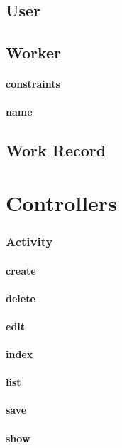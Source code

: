 \documentclass[12pt]{article}
\begin{document}
\setcounter{paragraph}{0}
\subsection{User}
\subsection{Worker}
\paragraph{constraints}
\paragraph{name}

\setcounter{paragraph}{0}
\subsection{Work Record}

\section{Controllers}\label{sec:Controllers}

\subsubsection{Activity}
\paragraph{create}
\paragraph{delete}
\paragraph{edit}
\paragraph{index}
\paragraph{list}
\paragraph{save}
\paragraph{show}
\end{document}
